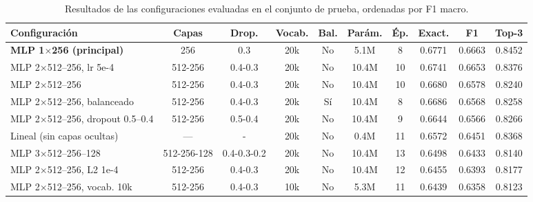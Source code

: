 \begin{table}[H]
\centering
\caption{Resultados de las configuraciones evaluadas en el conjunto de prueba, ordenadas por F1 macro.}
\label{tab:experimentos}
\footnotesize
\setlength{\tabcolsep}{3pt}
\begin{tabular}{lccccccccc}
\toprule
Configuración & Capas & Drop. & Vocab. & Bal. & Parám. & Ép. & Exact. & F1 & Top-3 \\
\midrule
\textbf{MLP 1$\times$256 (principal)} & 256 & 0.3 & 20k & No & 5.1M & 8 & 0.6771 & 0.6663 & 0.8452 \\
MLP 2$\times$512--256, lr 5e-4 & 512-256 & 0.4-0.3 & 20k & No & 10.4M & 10 & 0.6741 & 0.6653 & 0.8376 \\
MLP 2$\times$512--256 & 512-256 & 0.4-0.3 & 20k & No & 10.4M & 10 & 0.6680 & 0.6578 & 0.8240 \\
MLP 2$\times$512--256, balanceado & 512-256 & 0.4-0.3 & 20k & Sí & 10.4M & 8 & 0.6686 & 0.6568 & 0.8258 \\
MLP 2$\times$512--256, dropout 0.5--0.4 & 512-256 & 0.5-0.4 & 20k & No & 10.4M & 9 & 0.6644 & 0.6566 & 0.8266 \\
Lineal (sin capas ocultas) & --- & - & 20k & No & 0.4M & 11 & 0.6572 & 0.6451 & 0.8368 \\
MLP 3$\times$512--256--128 & 512-256-128 & 0.4-0.3-0.2 & 20k & No & 10.4M & 13 & 0.6498 & 0.6433 & 0.8140 \\
MLP 2$\times$512--256, L2 1e-4 & 512-256 & 0.4-0.3 & 20k & No & 10.4M & 12 & 0.6455 & 0.6393 & 0.8177 \\
MLP 2$\times$512--256, vocab. 10k & 512-256 & 0.4-0.3 & 10k & No & 5.3M & 11 & 0.6439 & 0.6358 & 0.8123 \\
\bottomrule
\end{tabular}
\end{table}
